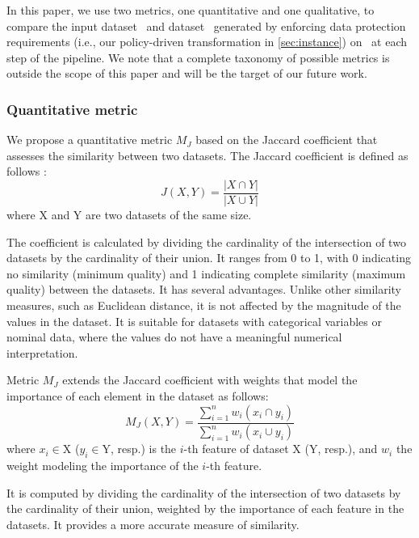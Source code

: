 In this paper, we use two metrics, one quantitative and one qualitative, to compare the input dataset \origdataset\ and dataset \transdataset\ generated by enforcing data protection requirements (i.e., our policy-driven transformation in \cref{sec:instance}) on \origdataset\ at each step of the pipeline. We note that a complete taxonomy of possible metrics is outside the scope of this paper and will be the target of our future work.

\subsubsection{Quantitative metric}
We propose a quantitative metric $M_J$ based on the Jaccard coefficient that assesses the similarity between two datasets. The Jaccard coefficient is defined as follows \cite{RAHMAN20102707}: \[J(X,Y) = \frac{|X \cap Y|}{|X \cup Y|}\]
where X and Y are two datasets of the same size.

The coefficient is calculated by dividing the cardinality of the intersection of two datasets by the cardinality of their union. It ranges from 0 to 1, with 0 indicating no similarity (minimum quality) and 1 indicating complete similarity (maximum quality) between the datasets. It has several advantages. Unlike other similarity measures, such as Euclidean distance, it is not affected by the magnitude of the values in the dataset. It is suitable for datasets with categorical variables or nominal data, where the values do not have a meaningful numerical interpretation.

Metric $M_J$ extends the Jaccard coefficient with weights that model the importance of each element in the dataset as follows:\[M_J(X,Y) = \frac{\sum_{i=1}^{n}w_i(x_i \cap y_i)}{\sum_{i=1}^{n}w_i(x_i \cup y_i)}\]
where $x_i$$\in$X ($y_i$$\in$Y, resp.) is the $i$-th feature of dataset X (Y, resp.), and $w_i$ the weight modeling the importance of the $i$-th feature.

It is computed by dividing the cardinality of the intersection of two datasets by the cardinality of their union, weighted by the importance of each feature in the datasets. It provides a more accurate measure of similarity. %

